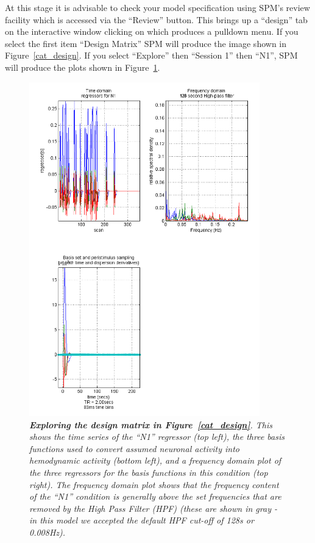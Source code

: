 At this stage it is advisable to check your model specification using SPM's review facility which is accessed via the ``Review'' button. This brings up a ``design'' tab on the interactive window clicking on which produces a pulldown menu. If you select the first item ``Design Matrix'' SPM will produce the image shown in Figure~\ref{cat_design}. If you select ``Explore'' then ``Session 1'' then ``N1'', SPM will produce the plots shown in Figure~\ref{cat_explore}.
\begin{figure}
\begin{center}
\includegraphics[width=100mm]{faces/cat_explore}
\caption{\em \textbf{Exploring the design matrix in Figure~\ref{cat_design}}. This shows the time series of the ``N1'' regressor (top left), the three basis functions used to convert assumed neuronal activity into hemodynamic activity (bottom left), and a frequency domain plot of the three regressors for the basis functions in this condition (top right). The frequency domain plot shows that the frequency content of the ``N1'' condition is generally above the set frequencies that are removed by the High Pass Filter (HPF) (these are shown in gray - in this model we accepted the default HPF cut-off of 128s or 0.008Hz). \label{cat_explore}}
\end{center}
\end{figure}

